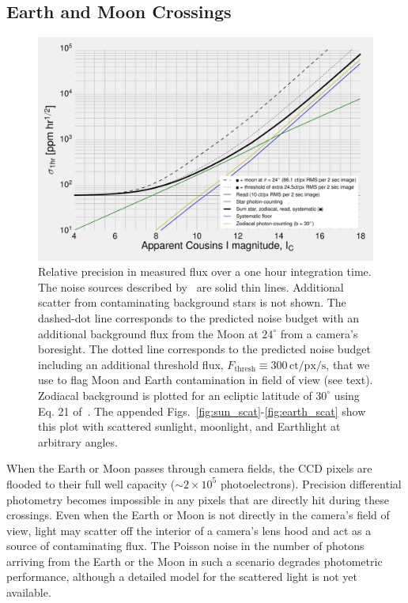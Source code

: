 \subsection{Earth and Moon Crossings}
\label{sec:earth_moon_crossings}
\begin{figure}[!tb]
	\centering
	\includegraphics{figures/precision_memo.pdf}
	\caption{Relative precision in measured flux over a one hour integration 
	time. The noise sources described by~\protect\citet{Sullivan_2015} are 
	solid thin lines.
	Additional scatter from contaminating background stars is not shown.
	The dashed-dot line corresponds to the predicted noise budget with an 
	additional background flux from the Moon 
	at $24^\circ$ from a camera's boresight.	
	The dotted line corresponds to the predicted noise budget including an 
	additional threshold flux, $F_\mathrm{thresh}\equiv 
	300\,\mathrm{ct/px/s}$, that we use to flag Moon and Earth contamination in 
	\tesss field of view (see text).
	Zodiacal background is plotted for an ecliptic latitude of $30^\circ$ using 
	Eq. 21 of~\protect\citet{Sullivan_2015}.
	The appended Figs.~\protect\ref{fig:sun_scat}-\protect\ref{fig:earth_scat} 
	show this plot with scattered sunlight, moonlight, and Earthlight at 
	arbitrary angles.
	}
	\label{fig:noise_with_moon}
\end{figure}

When the Earth or Moon passes through \tesss camera fields, the CCD
pixels are flooded to their full well capacity ($\sim2\times10^5$
photoelectrons).  Precision differential photometry becomes impossible
in any pixels that are directly hit during these crossings.  Even when
the Earth or Moon is not directly in the camera's field of
view, light may scatter off the interior of a camera's lens hood
and act as a source of contaminating flux. The Poisson noise in the number of 
photons arriving from the Earth or the Moon in such a scenario degrades \tesss
photometric performance, although a detailed model for the scattered light is not yet available.

